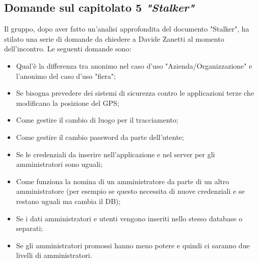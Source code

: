 \subsection{Domande sul capitolato 5 \textit{"Stalker"}}
Il gruppo, dopo aver fatto un'analisi approfondita del documento "Stalker", ha stilato una serie di domande da chiedere a Davide Zanetti al momento dell'incontro.
Le seguenti domande sono:
\begin{itemize}
	\item Qual'è la differenza tra anonimo nel caso d’uso "Azienda/Organizzazione" e l’anonimo del caso d’uso "fiera";
	\item Se bisogna prevedere dei sistemi di sicurezza contro le applicazioni terze che modificano la posizione del GPS;
	\item Come gestire il cambio di luogo per il tracciamento;
	\item Come gestire il cambio password da parte dell’utente;
	\item Se le credenziali da inserire nell’applicazione e nel server per gli amministratori sono uguali;
	\item Come funziona la nomina di un amministratore da parte di un altro amministratore (per esempio se questo necessita di nuove credenziali e se restano uguali ma cambia il DB);
	\item Se i dati amministratori e utenti vengono inseriti nello stesso database o separati;
	\item Se gli amministratori promossi hanno meno potere e quindi ci saranno due livelli di amministratori.
\end{itemize}



\clearpage
